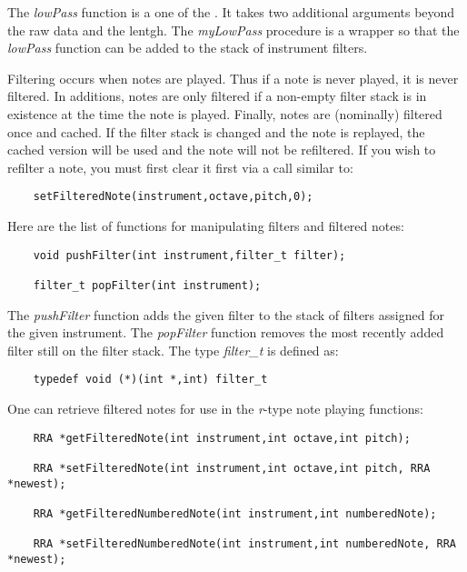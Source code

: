 \documentclass{article}
\begin{document}
The {\it lowPass} function is a one of the 
.
It
takes two additional arguments beyond the raw data and the lentgh. The
{\it myLowPass} procedure is a wrapper so that the {\it lowPass} function
can be added to the stack of instrument filters.

Filtering occurs when notes are played. Thus if a note is never
played, it is never filtered. In additions, notes are only filtered
if a non-empty filter stack is in existence at the time the
note is played. Finally, notes are (nominally) filtered once and
cached.  If the filter stack is changed and the note is replayed, the
cached version will be used and the note will not be refiltered.
If you wish to refilter a note, you must first clear it first via a call
similar to:

\begin{verbatim}
    setFilteredNote(instrument,octave,pitch,0);
\end{verbatim}

Here are the list of functions for manipulating filters and filtered
notes:

\begin{verbatim}
    void pushFilter(int instrument,filter_t filter);

    filter_t popFilter(int instrument);
\end{verbatim}

The {\it pushFilter} function adds the given filter to the stack of
filters assigned for the given instrument. The {\it popFilter} function
removes the most recently added filter still on the filter stack.
The type {\it filter\_t} is defined as:

\begin{verbatim}
    typedef void (*)(int *,int) filter_t
\end{verbatim}


One can retrieve filtered notes for use in the {\it r}-type note
playing functions:

\begin{verbatim}
    RRA *getFilteredNote(int instrument,int octave,int pitch);

    RRA *setFilteredNote(int instrument,int octave,int pitch, RRA *newest);

    RRA *getFilteredNumberedNote(int instrument,int numberedNote);

    RRA *setFilteredNumberedNote(int instrument,int numberedNote, RRA *newest);
\end{verbatim}
\end{document}
